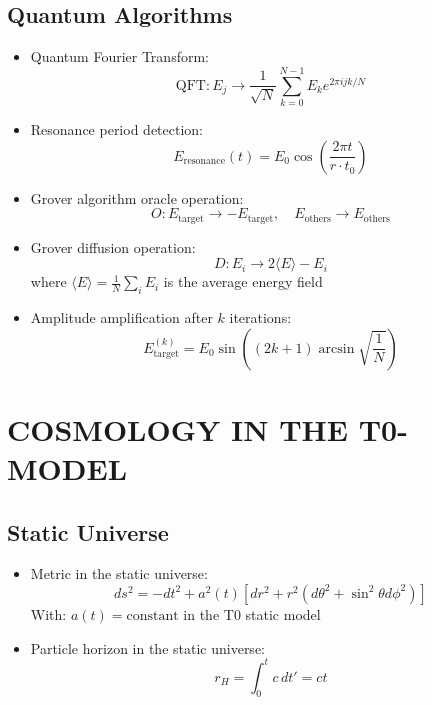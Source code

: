 \documentclass[12pt,a4paper]{article}
\begin{document}
	\subsection{Quantum Algorithms}
	\begin{itemize}
		\item Quantum Fourier Transform:
		$$\text{QFT}: E_j \rightarrow \frac{1}{\sqrt{N}} \sum_{k=0}^{N-1} E_k e^{2\pi i jk/N}$$
		
		\item Resonance period detection:
		$$E_{\text{resonance}}(t) = E_0 \cos\left(\frac{2\pi t}{r \cdot t_0}\right)$$
		
		\item Grover algorithm oracle operation:
		$$O: E_{\text{target}} \rightarrow -E_{\text{target}}, \quad E_{\text{others}} \rightarrow E_{\text{others}}$$
		
		\item Grover diffusion operation:
		$$D: E_i \rightarrow 2\langle E \rangle - E_i$$
		where $\langle E \rangle = \frac{1}{N}\sum_i E_i$ is the average energy field
		
		\item Amplitude amplification after $k$ iterations:
		$$E_{\text{target}}^{(k)} = E_0 \sin\left((2k+1)\arcsin\sqrt{\frac{1}{N}}\right)$$
	\end{itemize}
	
	\section{COSMOLOGY IN THE T0-MODEL}
	
\subsection{Static Universe}
\begin{itemize}
	\item Metric in the static universe:
	$$ds^2 = -dt^2 + a^2(t)[dr^2 + r^2(d\theta^2 + \sin^2\theta d\phi^2)]$$
	With: $a(t) = \text{constant}$ in the T0 static model
	
	\item Particle horizon in the static universe:
	$$r_H = \int_0^t c \, dt' = ct$$
\end{itemize}
\end{document}
